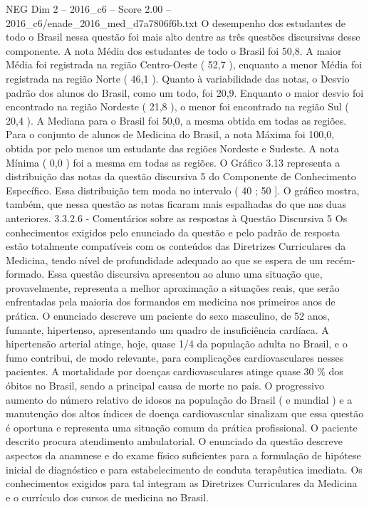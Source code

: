 \begin{textsample}{NEG Dim 2 – 2016\_c6 – Score 2.00 – 2016\_c6/enade\_2016\_med\_d7a7806f6b.txt}
O desempenho dos estudantes de todo o Brasil nessa questão foi mais alto dentre as três questões discursivas desse componente.
A nota Média dos estudantes de todo o Brasil foi 50,8.
A maior Média foi registrada na região Centro-Oeste ( 52,7 ), enquanto a menor Média foi registrada na região Norte ( 46,1 ).
Quanto à variabilidade das notas, o Desvio padrão dos alunos do Brasil, como um todo, foi 20,9.
Enquanto o maior desvio foi encontrado na região Nordeste ( 21,8 ), o menor foi encontrado na região Sul ( 20,4 ).
A Mediana para o Brasil foi 50,0, a mesma obtida em todas as regiões.
Para o conjunto de alunos de Medicina do Brasil, a nota Máxima foi 100,0, obtida por pelo menos um estudante das regiões Nordeste e Sudeste.
A nota Mínima ( 0,0 ) foi a mesma em todas as regiões.
O Gráfico 3.13 representa a distribuição das notas da questão discursiva 5 do Componente de Conhecimento Específico.
Essa distribuição tem moda no intervalo ( 40 ; 50 ].
O gráfico mostra, também, que nessa questão as notas ficaram mais espalhadas do que nas duas anteriores. 3.3.2.6 - Comentários sobre as respostas à Questão Discursiva 5 Os conhecimentos exigidos pelo enunciado da questão e pelo padrão de resposta estão totalmente compatíveis com os conteúdos das Diretrizes Curriculares da Medicina, tendo nível de profundidade adequado ao que se espera de um recém-formado.
Essa questão discursiva apresentou ao aluno uma situação que, provavelmente, representa a melhor aproximação a situações reais, que serão enfrentadas pela maioria dos formandos em medicina nos primeiros anos de prática.
O enunciado descreve um paciente do sexo masculino, de 52 anos, fumante, hipertenso, apresentando um quadro de insuficiência cardíaca.
A hipertensão arterial atinge, hoje, quase 1/4 da população adulta no Brasil, e o fumo contribui, de modo relevante, para complicações cardiovasculares nesses pacientes.
A mortalidade por doenças cardiovasculares atinge quase 30 \% dos óbitos no Brasil, sendo a principal causa de morte no país.
O progressivo aumento do número relativo de idosos na população do Brasil ( e mundial ) e a manutenção dos altos índices de doença cardiovascular sinalizam que essa questão é oportuna e representa uma situação comum da prática profissional.
O paciente descrito procura atendimento ambulatorial.
O enunciado da questão descreve aspectos da anamnese e do exame físico suficientes para a formulação de hipótese inicial de diagnóstico e para estabelecimento de conduta terapêutica imediata.
Os conhecimentos exigidos para tal integram as Diretrizes Curriculares da Medicina e o currículo dos cursos de medicina no Brasil.

\end{textsample}
